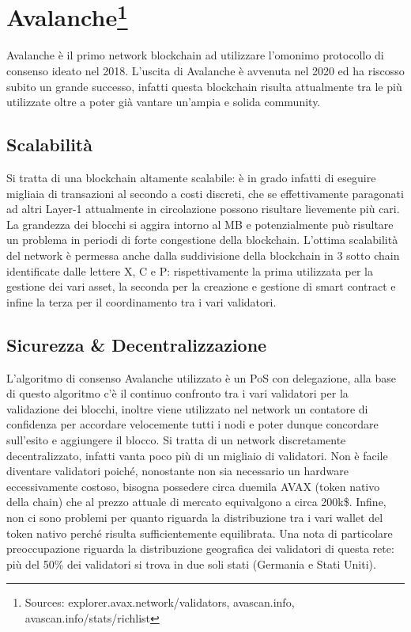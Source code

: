 \documentclass[a4paper, 12pt]{article}
\begin{document}
\newpage
\section*{Avalanche\footnote{Sources: explorer.avax.network/validators, avascan.info, avascan.info/stats/richlist}}
Avalanche è il primo network blockchain ad utilizzare l'omonimo protocollo di consenso ideato nel 2018. L'uscita di Avalanche è avvenuta nel 2020 ed ha riscosso subito un grande successo, infatti questa blockchain risulta attualmente tra le più utilizzate oltre a poter già vantare un'ampia e solida community.
\subsection*{Scalabilità}
Si tratta di una blockchain altamente scalabile: è in grado infatti di eseguire migliaia di transazioni al secondo a costi discreti, che se effettivamente paragonati ad altri Layer-1 attualmente in circolazione possono risultare lievemente più cari. La grandezza dei blocchi si aggira intorno al MB e potenzialmente può risultare un problema in periodi di forte congestione della blockchain. L'ottima scalabilità del network è permessa anche dalla suddivisione della blockchain in 3 sotto chain identificate dalle lettere X, C e P:  rispettivamente la prima utilizzata per la gestione dei vari asset, la seconda per la creazione e gestione di smart contract e infine la terza per il coordinamento tra i vari validatori.

\subsection*{Sicurezza \& Decentralizzazione}
L'algoritmo di consenso Avalanche utilizzato è un PoS con delegazione, alla base di questo algoritmo c'è il continuo confronto tra i vari validatori per la validazione dei blocchi, inoltre viene utilizzato nel network un contatore di confidenza per accordare velocemente tutti i nodi e poter dunque concordare sull'esito e aggiungere il blocco.
Si tratta di un network discretamente decentralizzato, infatti vanta poco più di un migliaio di validatori. Non è facile diventare validatori poiché, nonostante non sia necessario un hardware eccessivamente costoso, bisogna possedere circa duemila AVAX (token nativo della chain) che al prezzo attuale di mercato equivalgono a circa 200k\$. Infine, non ci sono problemi per quanto riguarda la distribuzione tra i vari wallet del token nativo perché risulta sufficientemente equilibrata.
Una nota di particolare preoccupazione riguarda la distribuzione geografica dei validatori di questa rete: più del 50\% dei validatori si trova in due soli stati (Germania e Stati Uniti).
\end{document}
